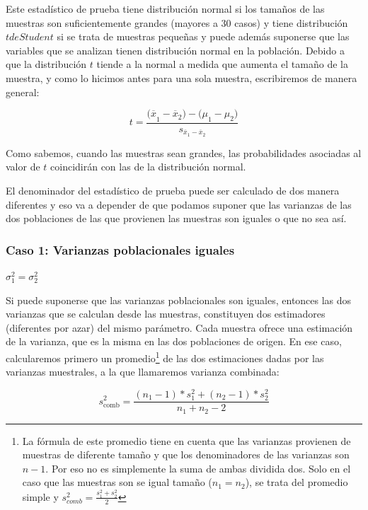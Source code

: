 \documentclass[]{book}
\let\rmarkdownfootnote\footnote%
\def\footnote{\protect\rmarkdownfootnote}
\begin{document}
Este estadístico de prueba tiene distribución normal si los tamaños de las muestras son suficientemente grandes (mayores a 30 casos) y tiene distribución \(t de Student\) si se trata de muestras pequeñas y puede además suponerse que las variables que se analizan tienen distribución normal en la población. Debido a que la distribución \(t\) tiende a la normal a medida que aumenta el tamaño de la muestra, y como lo hicimos antes para una sola muestra, escribiremos de manera general:

\[t = \frac{{(\overline{x}}_{1} - {\overline{x}}_{2}) - {(\mu}_{1} - \mu_{2})}{s_{{\overline{x}}_{1} - {\overline{x}}_{2}}}\]

Como sabemos, cuando las muestras sean
grandes, las probabilidades asociadas al valor de \(t\) coincidirán con
las de la distribución normal.

El denominador del estadístico de prueba puede
ser calculado de dos manera diferentes y eso va a depender de que
podamos suponer que las varianzas de las dos poblaciones de las que
provienen las muestras son iguales o que no sea así.

\hypertarget{caso-1-varianzas-poblacionales-iguales}{%
\subsubsection{Caso 1: Varianzas poblacionales iguales}\label{caso-1-varianzas-poblacionales-iguales}}

\(\sigma_{1}^{2} = \sigma_{2}^{2}\)

Si puede suponerse que las varianzas poblacionales son iguales, entonces las dos varianzas que se calculan desde las muestras, constituyen dos estimadores (diferentes por azar) del mismo parámetro. Cada muestra ofrece una estimación de la varianza, que es la misma en las dos poblaciones de origen. En ese caso, calcularemos primero un promedio\footnote{La fórmula de este promedio tiene en cuenta que las varianzas provienen de muestras de diferente tamaño y que los denominadores de las varianzas son \(n-1\). Por eso no es simplemente la suma de ambas dividida dos. Solo en el caso que las muestras son se igual tamaño (\(n_1=n_2\)), se trata del promedio simple y \(s_{comb}^{2} = \frac{s_{1}^{2} + s_{2}^{2}}{2}\)} de las dos estimaciones dadas por las varianzas muestrales, a la que llamaremos varianza combinada:

\[s_{\text{comb}}^{2} = \frac{\left( n_{1} - 1 \right)*s_{1}^{2} + \left( n_{2} - 1 \right)*s_{2}^{2}}{n_{1} + n_{2} - 2}\]
\end{document}
